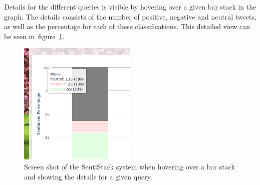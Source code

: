 Details for the different queries is visible by hovering over a given bar stack in the graph. The details consists of the number of positive, negative and neutral tweets, as well as the percentage for each of these classifications. This detailed view can be seen in~figure~\ref{fig:sentistack_details}.

\begin{figure}[htb!]
\begin{center}
 \includegraphics[width=0.5\textwidth]{../img/sentistack_details.png}
 \caption[SentiStack detailed view screen shot]{Screen shot of the SentiStack system  when hovering over a bar stack and showing the details for a given query.}
 \label{fig:sentistack_details}
\end{center}
\end{figure}
